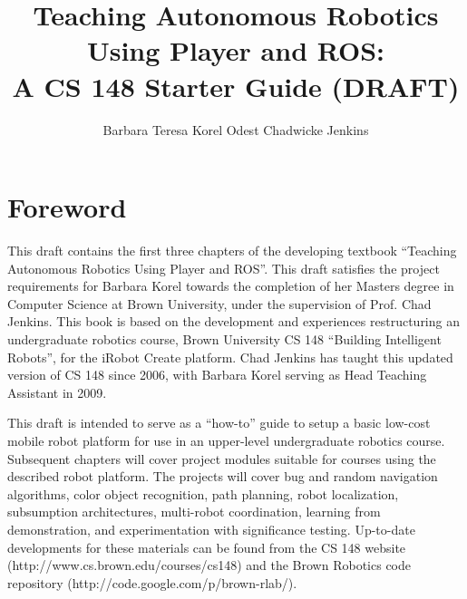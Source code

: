 \documentclass[12pt,openany]{book} %
\title{Teaching Autonomous Robotics Using Player and ROS: \\ A CS 148 Starter Guide (DRAFT)}
\author{Barbara Teresa Korel \hspace{1cm} Odest Chadwicke Jenkins}
\begin{document}
\maketitle



\chapter*{Foreword}

This draft contains the first three chapters of the developing textbook ``Teaching Autonomous Robotics Using Player and ROS''.  This draft satisfies the project requirements for Barbara Korel towards the completion of her Masters degree in Computer Science at Brown University, under the supervision of Prof. Chad Jenkins.  This book is based on the development and experiences restructuring an undergraduate robotics course, Brown University CS 148 ``Building Intelligent Robots'', for the iRobot Create platform.  Chad Jenkins has taught this updated version of CS 148 since 2006, with Barbara Korel serving as Head Teaching Assistant in 2009.

This draft is intended to serve as a ``how-to'' guide to setup a basic low-cost mobile robot platform for use in an upper-level undergraduate robotics course.  Subsequent chapters will cover project modules suitable for courses using the described robot platform.  The projects will cover bug and random navigation algorithms, color object recognition, path planning, robot localization, subsumption architectures, multi-robot coordination, learning from demonstration, and experimentation with significance testing.  Up-to-date developments for these materials can be found from the CS 148 website (http://www.cs.brown.edu/courses/cs148) and the Brown Robotics code repository (http://code.google.com/p/brown-rlab/).
\end{document}
